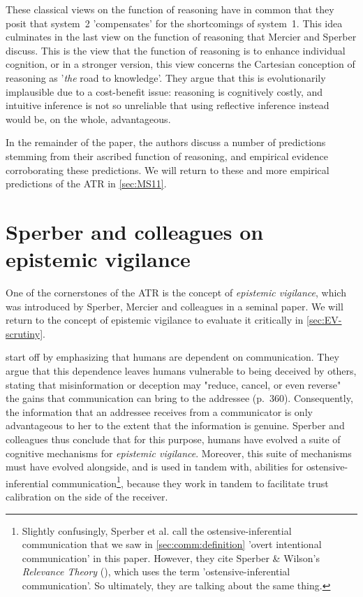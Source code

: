 These classical views on the function of reasoning have in common that they posit that system~2 'compensates' for the shortcomings of system~1.
This idea culminates in the last view on the function of reasoning that Mercier and Sperber discuss. This is the view that the function of reasoning is to enhance individual cognition, or in a stronger version, this view concerns the Cartesian conception of reasoning as '\emph{the} road to knowledge'.
They argue that this is evolutionarily implausible due to a cost-benefit issue:
reasoning is cognitively costly, and intuitive inference is not so unreliable that using reflective inference instead would be, on the whole, advantageous.

In the remainder of the paper, the authors discuss a number of predictions stemming from their ascribed function of reasoning, and empirical evidence corroborating these predictions. We will return to these and more empirical predictions of the ATR in \cref{sec:MS11}.

\section{Sperber and colleagues on epistemic vigilance}
\label{sec:Sperber10}

One of the cornerstones of the ATR is the concept of \emph{epistemic vigilance}, which was introduced by Sperber, Mercier and colleagues in a seminal \citeyear{Sperber10} paper.
We will return to the concept of epistemic vigilance to evaluate it critically in \cref{sec:EV-scrutiny}.

\citet{Sperber10} start off by emphasizing that humans are dependent on communication. They argue that this dependence leaves humans vulnerable to being deceived by others, stating that misinformation or deception may "reduce, cancel, or even reverse" the gains that communication can bring to the addressee (p.~360).
Consequently, the information that an addressee receives from a communicator is only advantageous to her to the extent that the information is genuine.
Sperber and colleagues thus conclude that for this purpose, humans have evolved a suite of cognitive mechanisms for \emph{epistemic vigilance}.
Moreover, this suite of mechanisms must have evolved alongside, and is used in tandem with, abilities for ostensive-inferential communication\footnote{Slightly confusingly, Sperber et al. call the ostensive-inferential communication that we saw in \cref{sec:comm:definition} 'overt intentional communication' in this paper. However, they cite Sperber \& Wilson's \emph{Relevance Theory} (\citeyear{SperberWilson86}), which uses the term 'ostensive-inferential communication'. So ultimately, they are talking about the same thing.}, because they work in tandem to facilitate trust calibration on the side of the receiver.

